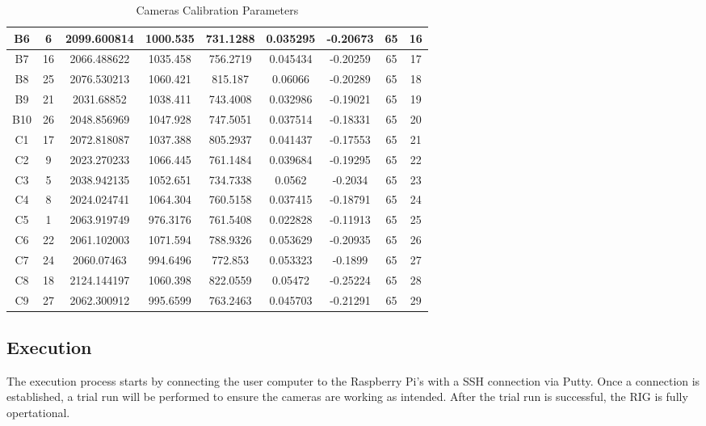 \documentclass[12pt]{report}
\begin{document}
\begin{table}[H]
{\begin{tabular}{|c|c|c|c|c|c|c|c|c|}
  B6    & 6     & 2099.600814 & 1000.535 & 731.1288 & 0.035295 & -0.20673 & 65 & 16 \\ \hline
  B7    & 16    & 2066.488622 & 1035.458 & 756.2719 & 0.045434 & -0.20259 & 65 & 17 \\ \hline
  B8    & 25    & 2076.530213 & 1060.421 & 815.187  & 0.06066  & -0.20289 & 65 & 18 \\ \hline
  B9    & 21    & 2031.68852  & 1038.411 & 743.4008 & 0.032986 & -0.19021 & 65 & 19 \\ \hline
  B10   & 26    & 2048.856969 & 1047.928 & 747.5051 & 0.037514 & -0.18331 & 65 & 20 \\ \hline
  C1    & 17    & 2072.818087 & 1037.388 & 805.2937 & 0.041437 & -0.17553 & 65 & 21 \\ \hline
  C2    & 9     & 2023.270233 & 1066.445 & 761.1484 & 0.039684 & -0.19295 & 65 & 22 \\ \hline
  C3    & 5     & 2038.942135 & 1052.651 & 734.7338 & 0.0562   & -0.2034  & 65 & 23 \\ \hline
  C4    & 8     & 2024.024741 & 1064.304 & 760.5158 & 0.037415 & -0.18791 & 65 & 24 \\ \hline
  C5    & 1     & 2063.919749 & 976.3176 & 761.5408 & 0.022828 & -0.11913 & 65 & 25 \\ \hline
  C6    & 22    & 2061.102003 & 1071.594 & 788.9326 & 0.053629 & -0.20935 & 65 & 26 \\ \hline
  C7    & 24    & 2060.07463  & 994.6496 & 772.853  & 0.053323 & -0.1899  & 65 & 27 \\ \hline
  C8    & 18    & 2124.144197 & 1060.398 & 822.0559 & 0.05472  & -0.25224 & 65 & 28 \\ \hline
  C9    & 27    & 2062.300912 & 995.6599 & 763.2463 & 0.045703 & -0.21291 & 65 & 29 \\ \hline
  \end{tabular}%
  }
  \caption{Cameras Calibration Parameters}
  \label{tab:Camera_Calibration}
  \end{table}

\subsection*{Execution}
The execution process starts by connecting the user computer to the Raspberry Pi's with a SSH connection via Putty.
Once a connection is established, a trial run will be performed to ensure the cameras are working as intended.
After the trial run is successful, the RIG is fully opertational.
\end{document}
